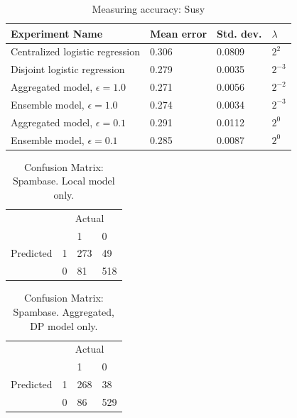 \begin{table}[H]
	\centering
	\begin{tabular}{|l|l|l|l|}
		{\bf Experiment Name}            & {\bf Mean error} & {\bf Std. dev.} & {\bf $\lambda$} \\
		\hline
		Centralized logistic regression  & 0.306            & 0.0809          & $2^{2}$         \\
		Disjoint logistic regression     & 0.279            & 0.0035          & $2^{-3}$        \\
		Aggregated model, $\epsilon=1.0$ & 0.271            & 0.0056          & $2^{-2}$        \\
		Ensemble model, $\epsilon=1.0$   & 0.274            & 0.0034          & $2^{-3}$        \\
		Aggregated model, $\epsilon=0.1$ & 0.291            & 0.0112          & $2^0$           \\
		Ensemble model, $\epsilon=0.1$   & 0.285            & 0.0087          & $2^0$          
	\end{tabular}
	\caption{Measuring accuracy: Susy}
	\label{tab:results_measuring_accuracy_susy}
\end{table}

\begin{table}[h]
	\centering
	\begin{tabular}{llll}
		& \multicolumn{3}{c}{Actual}                                                      \\
		\multicolumn{1}{c}{} &                        & 1                         & 0                          \\ \cline{3-4} 
		Predicted            & \multicolumn{1}{l|}{1} & \multicolumn{1}{l|}{273} & \multicolumn{1}{l|}{49}   \\ \cline{3-4} 
		& \multicolumn{1}{l|}{0} & \multicolumn{1}{l|}{81} & \multicolumn{1}{l|}{518} \\ \cline{3-4} 
	\end{tabular}
	\caption{Confusion Matrix: Spambase. Local model only.}
	\label{fig:confmat_spam_local}
\end{table}

\begin{table}[h]
	\centering
	\begin{tabular}{llll}
		& \multicolumn{3}{c}{Actual}                                                      \\
		\multicolumn{1}{c}{} &                        & 1                         & 0                          \\ \cline{3-4} 
		Predicted            & \multicolumn{1}{l|}{1} & \multicolumn{1}{l|}{268} & \multicolumn{1}{l|}{38}   \\ \cline{3-4} 
		& \multicolumn{1}{l|}{0} & \multicolumn{1}{l|}{86} & \multicolumn{1}{l|}{529} \\ \cline{3-4} 
	\end{tabular}
	\caption{Confusion Matrix: Spambase. Aggregated, DP model only.}
	\label{fig:confmat_spam_aggdp}
\end{table}

